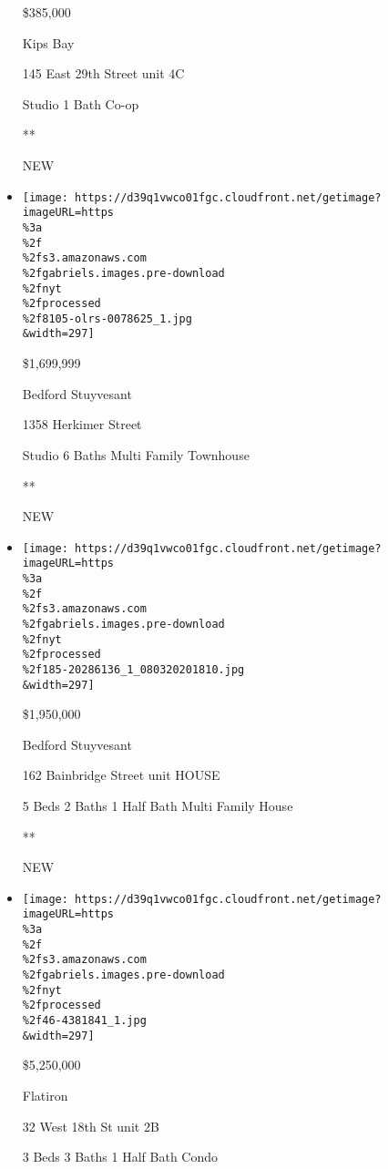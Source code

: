 \begin{itemize}
  \$385,000

  Kips Bay

  145 East 29th Street unit 4C

  Studio \textbar{} 1 Bath \textbar{} Co-op

  **

  NEW
\item
  \href{/real-estate/usa/ny/brooklyn/bedford-stuyvesant/homes-for-sale/1358-herkimer-street/8105-OLRS-0078625?}{}

  \texttt{[image: https://d39q1vwco01fgc.cloudfront.net/getimage?imageURL=https\\\%3a\\\%2f\\\%2fs3.amazonaws.com\\\%2fgabriels.images.pre-download\\\%2fnyt\\\%2fprocessed\\\%2f8105-olrs-0078625\_1.jpg\\\&width=297]}

  \$1,699,999

  Bedford Stuyvesant

  1358 Herkimer Street

  Studio \textbar{} 6 Baths \textbar{} Multi Family Townhouse

  **

  NEW
\item
  \href{/real-estate/usa/ny/brooklyn/bedford-stuyvesant/homes-for-sale/162-bainbridge-street/185-20286136?}{}

  \texttt{[image: https://d39q1vwco01fgc.cloudfront.net/getimage?imageURL=https\\\%3a\\\%2f\\\%2fs3.amazonaws.com\\\%2fgabriels.images.pre-download\\\%2fnyt\\\%2fprocessed\\\%2f185-20286136\_1\_080320201810.jpg\\\&width=297]}

  \$1,950,000

  Bedford Stuyvesant

  162 Bainbridge Street unit HOUSE

  5 Beds \textbar{} 2 Baths \textbar{} 1 Half Bath \textbar{} Multi
  Family House

  **

  NEW
\item
  \href{/real-estate/usa/ny/new-york/flatiron/homes-for-sale/32-west-18th-st/46-4381841?}{}

  \texttt{[image: https://d39q1vwco01fgc.cloudfront.net/getimage?imageURL=https\\\%3a\\\%2f\\\%2fs3.amazonaws.com\\\%2fgabriels.images.pre-download\\\%2fnyt\\\%2fprocessed\\\%2f46-4381841\_1.jpg\\\&width=297]}

  \$5,250,000

  Flatiron

  32 West 18th St unit 2B

  3 Beds \textbar{} 3 Baths \textbar{} 1 Half Bath \textbar{} Condo


\end{itemize}
